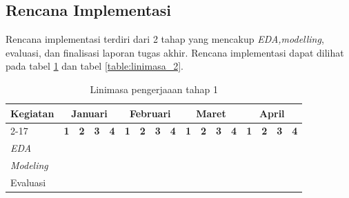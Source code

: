 \subsection{Rencana Implementasi}
Rencana implementasi terdiri dari 2 tahap yang mencakup \textit{EDA,modelling}, evaluasi, dan finalisasi laporan tugas akhir. Rencana implementasi dapat dilihat pada tabel \ref{table:linimasa_1} dan tabel \ref{table:linimasa_2}. 

\begin{table}[H]
\centering
\caption{Linimasa pengerjaaan tahap 1}
\label{table:linimasa_1}
\begin{tabular}{|l|c|c|c|c|c|c|c|c|c|c|c|c|c|c|c|c|}
\hline
\rowcolor[HTML]{C0C0C0} 
\textbf{Kegiatan} & \multicolumn{4}{c|}{\textbf{Januari}} & \multicolumn{4}{c|}{\textbf{Februari}} & \multicolumn{4}{c|}{\textbf{Maret}} & \multicolumn{4}{c|}{\textbf{April}} \\
\cline{2-17} 
\rowcolor[HTML]{C0C0C0} 
 & \textbf{1} & \textbf{2} & \textbf{3} & \textbf{4} & \textbf{1} & \textbf{2} & \textbf{3} & \textbf{4} & \textbf{1} & \textbf{2} & \textbf{3} & \textbf{4} & \textbf{1} & \textbf{2} & \textbf{3} & \textbf{4} \\
\hline
\textit{EDA} & & \cellcolor[HTML]{0000FF} & \cellcolor[HTML]{0000FF} & \cellcolor[HTML]{0000FF} & \cellcolor[HTML]{0000FF} & \cellcolor[HTML]{0000FF} & \cellcolor[HTML]{0000FF} & \cellcolor[HTML]{0000FF} & & & & & & & & \\
\hline
\textit{Modeling} & & & & & & & & & \cellcolor[HTML]{0000FF} & \cellcolor[HTML]{0000FF} & \cellcolor[HTML]{0000FF} & \cellcolor[HTML]{0000FF} & \cellcolor[HTML]{0000FF} & \cellcolor[HTML]{0000FF} & \cellcolor[HTML]{0000FF} & \cellcolor[HTML]{0000FF} \\
\hline
Evaluasi & & & & & & & & & \cellcolor[HTML]{0000FF} & \cellcolor[HTML]{0000FF} & \cellcolor[HTML]{0000FF} & \cellcolor[HTML]{0000FF} & \cellcolor[HTML]{0000FF} & \cellcolor[HTML]{0000FF} & \cellcolor[HTML]{0000FF} & \cellcolor[HTML]{0000FF} \\

\hline
\end{tabular}
\end{table}

